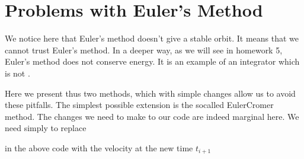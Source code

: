 \documentclass[letterpaper,10pt,english]{sphinxmanual}
\begin{document}
\begin{sphinxVerbatim}[commandchars=\\\{\}]
   
\PYG{p}{[}\PYG{p}{]} \PYG{p}{[}\PYG{p}{]}
\end{sphinxVerbatim}


\section{Problems with Euler’s Method}
\label{\detokenize{chapter1:problems-with-euler-s-method}}
We notice here that Euler’s method doesn’t give a stable orbit. It
means that we cannot trust Euler’s method. In a deeper way, as we will
see in homework 5, Euler’s method does not conserve energy. It is an
example of an integrator which is not
.

Here we present thus two methods, which with simple changes allow us to avoid these pitfalls. The simplest possible extension is the so\sphinxhyphen{}called Euler\sphinxhyphen{}Cromer method.
The changes we need to make to our code are indeed marginal here.
We need simply to replace

\begin{sphinxVerbatim}[commandchars=\\\{\}]
    \PYG{p}{[}\PYG{p}{]}  \PYG{p}{[}\PYG{p}{]}  \PYG{p}{[}\PYG{p}{]}
\end{sphinxVerbatim}

in the above code with the velocity at the new time \(t_{i+1}\)

\begin{sphinxVerbatim}[commandchars=\\\{\}]
    \PYG{p}{[}\PYG{p}{]}  \PYG{p}{[}\PYG{p}{]}  \PYG{p}{[}\PYG{p}{]}
\end{sphinxVerbatim}
\end{document}
